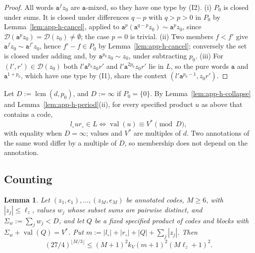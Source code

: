 \documentclass[11pt]{article}
\numberwithin{equation}{section}
\theoremstyle{plain}
\newtheorem{lemma}[theorem]{Lemma}
\theoremstyle{definition}
\theoremstyle{remark}
\newcommand{\D}{\mathcal{D}}
\theoremstyle{plain}
\begin{document}
\begin{proof}
All words $\mathtt a^fz_0$ are $\mathtt a$-mixed, so they have one type by (I2).
(i) $P_0$ is closed under sums.  It is closed under differences $q-p$ with
$q>p>0$ in $P_0$ by Lemma~\ref{lem:app-h-cancel}, applied to
$\mathtt a^p(\mathtt a^{q-p}z_0)\sim\mathtt a^pz_0$, since $\D(\mathtt
a^pz_0)=\D(z_0)\ne\emptyset$; the case $p=0$ is trivial.
(ii) Two members $f<f'$ give $\mathtt a^fz_0\sim\mathtt a^{f'}z_0$, hence
$f'-f\in P_0$ by Lemma~\ref{lem:app-h-cancel}; conversely the set is closed
under adding and, by $\mathtt a^{p_0}z_0\sim z_0$, under subtracting $p_0$.  (iii)
For $(l',r')\in\D(z_0)$ both $l'\mathtt a^{p_0}z_0r'$ and $l'\mathtt
a^{2p_0}z_0r'$ lie in $L$, so the pure words $\mathtt a$ and $\mathtt a^{1+p_0}$,
which have one type by (I1), share the context $(l'\mathtt a^{p_0-1},z_0r')$.
\end{proof}

Let $D:=\operatorname{lcm}(d,p_0)$, and $D:=\infty$ if $P_0=\{0\}$.  By
Lemma~\ref{lem:app-h-collapse} and Lemma~\ref{lem:app-h-period}(ii), for
every specified product $u$ as above that contains a code,
\begin{equation}
\label{eq:app-h-member}
 l_\circ ur_\circ\in L\iff\operatorname{val}(u)\equiv V^*\pmod D,
\end{equation}
with equality when $D=\infty$; values and $V^*$ are multiples of $d$.  Two
annotations of the same word differ by a multiple of $D$, so membership does
not depend on the annotation.

\subsection{Counting}

\begin{lemma}
\label{lem:app-h-count}
Let $(z_1,e_1),\ldots,(z_M,e_M)$ be annotated codes, $M\ge6$, with
$|z_j|\le\ell_z$, values $w_j$ whose subset sums are pairwise distinct, and
$\Sigma_w:=\sum_jw_j<D$, and let $Q$ be a fixed specified product of codes and
blocks with $\Sigma_w+\operatorname{val}(Q)=V^*$.  Put $m:=|l_\circ|+|r_\circ|
+|Q|+\sum_j|z_j|$.  Then
\[
 (27/4)^{\lfloor M/3\rfloor}\le(M+1)^2k_V(m+1)^2(M\ell_z+1)^2.
\]
\end{lemma}
\end{document}
